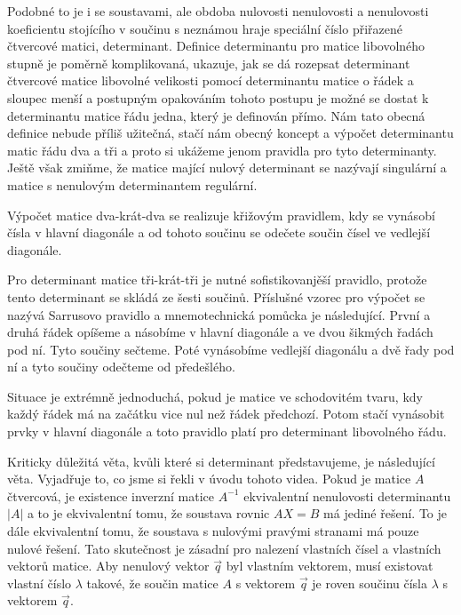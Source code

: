 \documentclass[12pt]{article}
\begin{document}
Podobné to je i se soustavami, ale obdoba nulovosti nenulovosti a nenulovosti koeficientu stojícího v součinu s neznámou hraje speciální číslo přiřazené čtvercové matici, determinant. Definice determinantu pro matice libovolného stupně je poměrně komplikovaná, ukazuje, jak se dá rozepsat determinant čtvercové matice libovolné velikosti pomocí determinantu matice o řádek a sloupec menší a postupným opakováním tohoto postupu je možné se dostat k determinantu matice řádu jedna, který je definován přímo. Nám tato obecná definice nebude příliš užitečná, stačí nám obecný koncept a výpočet determinantu matic řádu dva a tři a proto si ukážeme jenom pravidla pro tyto determinanty. Ještě však zmiňme, že matice mající nulový determinant se nazývají singulární a matice s nenulovým determinantem regulární.

Výpočet matice dva-krát-dva se realizuje křižovým pravidlem, kdy se vynásobí čísla v hlavní diagonále a od tohoto součinu se odečete součin čísel ve vedlejší diagonále.

Pro determinant matice tři-krát-tři je nutné sofistikovanjěší pravidlo, protože tento determinant se skládá ze šesti součinů. Příslušné vzorec pro výpočet se nazývá Sarrusovo pravidlo a mnemotechnická pomůcka je následující. První a druhá řádek opíšeme a násobíme v hlavní diagonále a ve dvou šikmých řadách pod ní. Tyto součiny sečteme. Poté vynásobíme vedlejší diagonálu a dvě řady pod ní a tyto součiny odečteme od předešlého.

Situace je extrémně jednoduchá, pokud je matice ve schodovitém tvaru, kdy každý řádek má na začátku vice nul než řádek předchozí. Potom stačí vynásobit prvky v hlavní diagonále a toto pravidlo platí pro determinant libovolného řádu.

Kriticky důležitá věta, kvůli které si determinant představujeme, je následující věta. Vyjadřuje to, co jsme si řekli v úvodu tohoto videa. Pokud je matice $A$ čtvercová, je existence inverzní matice $A^{-1}$ ekvivalentní nenulovosti determinantu $|A|$ a to je ekvivalentní tomu, že soustava rovnic $AX=B$ má jediné řešení. To je dále ekvivalentní tomu, že soustava s nulovými pravými stranami má pouze nulové řešení. Tato skutečnost je zásadní pro nalezení vlastních čísel a vlastních vektorů matice. Aby nenulový vektor $\vec q$ byl vlastním vektorem, musí existovat vlastní číslo $ \lambda$ takové, že součin matice $A$ s vektorem $\vec q$ je roven součinu čísla $\lambda$ s vektorem $\vec q$.
\end{document}
